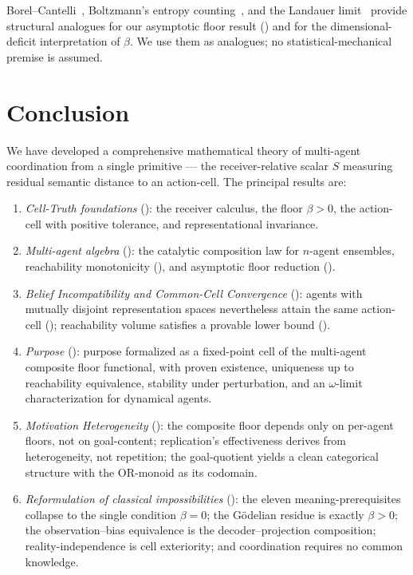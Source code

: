 \documentclass[11pt,a4paper]{article}
\begin{document}
Borel--Cantelli~\cite{borel1909,cantelli1917}, Boltzmann's entropy
counting~\cite{boltzmann1877}, and the Landauer
limit~\cite{landauer1961,bennett1973} provide structural
analogues for our asymptotic floor result ()
and for the dimensional-deficit interpretation of $\beta$. We use
them as analogues; no statistical-mechanical premise is assumed.

\section{Conclusion}
\label{sec:conclusion}

We have developed a comprehensive mathematical theory of multi-agent
coordination from a single primitive --- the receiver-relative scalar
$S$ measuring residual semantic distance to an action-cell. The
principal results are:

\begin{enumerate}[label=(\arabic*),leftmargin=*]
\item \emph{Cell-Truth foundations} (): the
receiver calculus, the floor $\beta>0$, the action-cell with positive
tolerance, and representational invariance.
\item \emph{Multi-agent algebra} (): the
catalytic composition law for $n$-agent ensembles, reachability
monotonicity (), and asymptotic floor reduction
().
\item \emph{Belief Incompatibility and Common-Cell Convergence}
(): agents with mutually
disjoint representation spaces nevertheless attain the same
action-cell (); reachability volume satisfies a
provable lower bound ().
\item \emph{Purpose} ():
purpose formalized as a fixed-point cell of the multi-agent composite
floor functional, with proven existence, uniqueness up to reachability
equivalence, stability under perturbation, and an $\omega$-limit
characterization for dynamical agents.
\item \emph{Motivation Heterogeneity} ():
the composite floor depends only on per-agent floors, not on
goal-content; replication's effectiveness derives from heterogeneity,
not repetition; the goal-quotient yields a clean
categorical structure with the OR-monoid as its codomain.
\item \emph{Reformulation of classical impossibilities}
():
the eleven meaning-prerequisites collapse to the single condition
$\beta=0$; the Gödelian residue is exactly $\beta>0$; the
observation--bias equivalence is the decoder--projection
composition; reality-independence is cell exteriority; and
coordination requires no common knowledge.
\end{enumerate}
\end{document}
